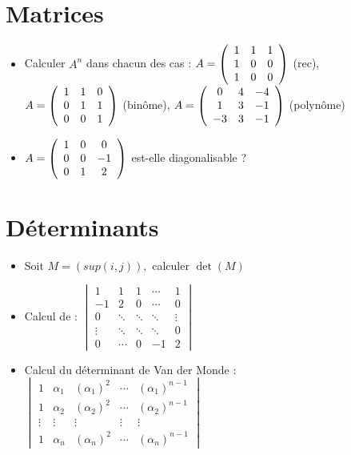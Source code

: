 \documentclass[a4paper, 11pt, french]{article}
\newcommand{\al}{\alpha}
\begin{document}
	\section*{Matrices}
	\begin{itemize}
 		\item Calculer $A^n$ dans chacun des cas : $A=\left( \begin{array}{c c c} 1 & 1 & 1 \\ 1 & 0 & 0 \\ 1 & 0 & 0 \end{array} \right)$ (rec), $A=\left( \begin{array}{c c c} 1 & 1 & 0 \\ 0 & 1 & 1 \\ 0 & 0 & 1 \end{array} \right)$ (binôme), $A=\left( \begin{array}{c c c} 0 & 4 & -4 \\ 1 & 3 & -1 \\ -3 & 3 & -1 \end{array} \right)$ (polynôme)
		\item $A=\left( \begin{array}{c c c} 1 & 0 & 0 \\ 0 & 0 & -1 \\ 0 & 1 & 2 \end{array} \right)$ est-elle diagonalisable ?
	\end{itemize}

	\section*{Déterminants}
	\begin{itemize}
 		\item Soit $M=(sup(i,j)),$ calculer $\det(M)$
 		\item Calcul de : $\begin{vmatrix} 
						  1 & 1 & 1 & \cdots & 1 \\
						  -1 & 2 & 0 & \cdots & 0 \\
						  0 & \ddots & \ddots & \ddots & \vdots \\
						  \vdots & \ddots & \ddots & \ddots & 0 \\
						  0 & \cdots & 0 & -1 & 2
					\end{vmatrix}$
 		\item Calcul du déterminant de Van der Monde : $\begin{vmatrix} 
						  1 & \al_1 & (\al_1)^2 & \cdots & (\al_1)^{n-1} \\
						  1 & \al_2 & (\al_2)^2 & \cdots & (\al_2)^{n-1} \\
						  \vdots & \vdots & \vdots & \vdots & \vdots \\
						  1 & \al_n & (\al_n)^2 & \cdots & (\al_n)^{n-1}
					\end{vmatrix}$
	\end{itemize}
\end{document}
